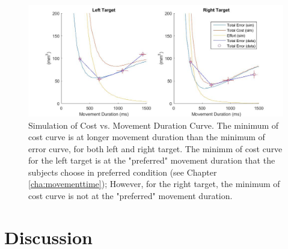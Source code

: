 \begin{figure}
	\centering
	\includegraphics[width=\linewidth]{"figures/variability - cost - minimum shift"}
	\caption[Simulation of Cost vs. Movement Duration Curve]{Simulation of Cost vs. Movement Duration Curve. The minimum of cost curve is at longer movement duration than the minimum of error curve, for both left and right target. The minimm of cost curve for the left target is at the "preferred" movement duration that the subjects choose in preferred condition (see Chapter \ref{cha:movementtime}); However, for the right target, the minimum of cost curve is not at the "preferred" movement duration.}
	\label{fig:variability---cost---minimum-shift}
\end{figure}

\section{Discussion}

